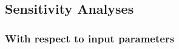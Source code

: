 \documentclass[11pt]{article}
\begin{document}

 

% 
% 




\subsection{Sensitivity Analyses}

\subsubsection{With respect to input parameters}
\end{document}
